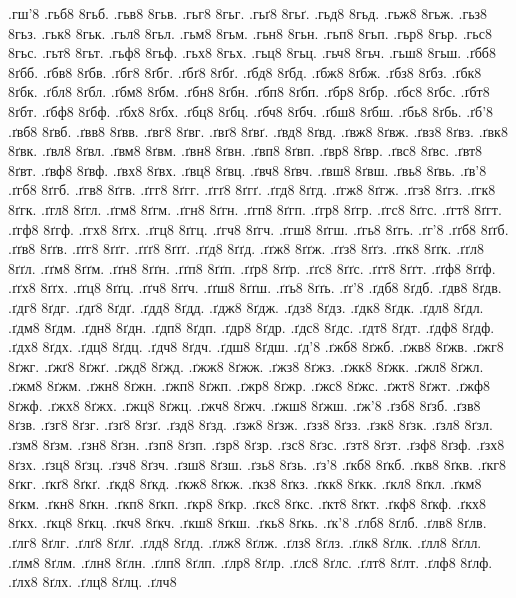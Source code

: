 {%
.гш'8
.гьб8
8гьб.
.гьв8
8гьв.
.гьг8
8гьг.
.гьґ8
8гьґ.
.гьд8
8гьд.
.гьж8
8гьж.
.гьз8
8гьз.
.гьк8
8гьк.
.гьл8
8гьл.
.гьм8
8гьм.
.гьн8
8гьн.
.гьп8
8гьп.
.гьр8
8гьр.
.гьс8
8гьс.
.гьт8
8гьт.
.гьф8
8гьф.
.гьх8
8гьх.
.гьц8
8гьц.
.гьч8
8гьч.
.гьш8
8гьш.
.ґбб8
8ґбб.
.ґбв8
8ґбв.
.ґбг8
8ґбг.
.ґбґ8
8ґбґ.
.ґбд8
8ґбд.
.ґбж8
8ґбж.
.ґбз8
8ґбз.
.ґбк8
8ґбк.
.ґбл8
8ґбл.
.ґбм8
8ґбм.
.ґбн8
8ґбн.
.ґбп8
8ґбп.
.ґбр8
8ґбр.
.ґбс8
8ґбс.
.ґбт8
8ґбт.
.ґбф8
8ґбф.
.ґбх8
8ґбх.
.ґбц8
8ґбц.
.ґбч8
8ґбч.
.ґбш8
8ґбш.
.ґбь8
8ґбь.
.ґб'8
.ґвб8
8ґвб.
.ґвв8
8ґвв.
.ґвг8
8ґвг.
.ґвґ8
8ґвґ.
.ґвд8
8ґвд.
.ґвж8
8ґвж.
.ґвз8
8ґвз.
.ґвк8
8ґвк.
.ґвл8
8ґвл.
.ґвм8
8ґвм.
.ґвн8
8ґвн.
.ґвп8
8ґвп.
.ґвр8
8ґвр.
.ґвс8
8ґвс.
.ґвт8
8ґвт.
.ґвф8
8ґвф.
.ґвх8
8ґвх.
.ґвц8
8ґвц.
.ґвч8
8ґвч.
.ґвш8
8ґвш.
.ґвь8
8ґвь.
.ґв'8
.ґгб8
8ґгб.
.ґгв8
8ґгв.
.ґгг8
8ґгг.
.ґгґ8
8ґгґ.
.ґгд8
8ґгд.
.ґгж8
8ґгж.
.ґгз8
8ґгз.
.ґгк8
8ґгк.
.ґгл8
8ґгл.
.ґгм8
8ґгм.
.ґгн8
8ґгн.
.ґгп8
8ґгп.
.ґгр8
8ґгр.
.ґгс8
8ґгс.
.ґгт8
8ґгт.
.ґгф8
8ґгф.
.ґгх8
8ґгх.
.ґгц8
8ґгц.
.ґгч8
8ґгч.
.ґгш8
8ґгш.
.ґгь8
8ґгь.
.ґг'8
.ґґб8
8ґґб.
.ґґв8
8ґґв.
.ґґг8
8ґґг.
.ґґґ8
8ґґґ.
.ґґд8
8ґґд.
.ґґж8
8ґґж.
.ґґз8
8ґґз.
.ґґк8
8ґґк.
.ґґл8
8ґґл.
.ґґм8
8ґґм.
.ґґн8
8ґґн.
.ґґп8
8ґґп.
.ґґр8
8ґґр.
.ґґс8
8ґґс.
.ґґт8
8ґґт.
.ґґф8
8ґґф.
.ґґх8
8ґґх.
.ґґц8
8ґґц.
.ґґч8
8ґґч.
.ґґш8
8ґґш.
.ґґь8
8ґґь.
.ґґ'8
.ґдб8
8ґдб.
.ґдв8
8ґдв.
.ґдг8
8ґдг.
.ґдґ8
8ґдґ.
.ґдд8
8ґдд.
.ґдж8
8ґдж.
.ґдз8
8ґдз.
.ґдк8
8ґдк.
.ґдл8
8ґдл.
.ґдм8
8ґдм.
.ґдн8
8ґдн.
.ґдп8
8ґдп.
.ґдр8
8ґдр.
.ґдс8
8ґдс.
.ґдт8
8ґдт.
.ґдф8
8ґдф.
.ґдх8
8ґдх.
.ґдц8
8ґдц.
.ґдч8
8ґдч.
.ґдш8
8ґдш.
.ґд'8
.ґжб8
8ґжб.
.ґжв8
8ґжв.
.ґжг8
8ґжг.
.ґжґ8
8ґжґ.
.ґжд8
8ґжд.
.ґжж8
8ґжж.
.ґжз8
8ґжз.
.ґжк8
8ґжк.
.ґжл8
8ґжл.
.ґжм8
8ґжм.
.ґжн8
8ґжн.
.ґжп8
8ґжп.
.ґжр8
8ґжр.
.ґжс8
8ґжс.
.ґжт8
8ґжт.
.ґжф8
8ґжф.
.ґжх8
8ґжх.
.ґжц8
8ґжц.
.ґжч8
8ґжч.
.ґжш8
8ґжш.
.ґж'8
.ґзб8
8ґзб.
.ґзв8
8ґзв.
.ґзг8
8ґзг.
.ґзґ8
8ґзґ.
.ґзд8
8ґзд.
.ґзж8
8ґзж.
.ґзз8
8ґзз.
.ґзк8
8ґзк.
.ґзл8
8ґзл.
.ґзм8
8ґзм.
.ґзн8
8ґзн.
.ґзп8
8ґзп.
.ґзр8
8ґзр.
.ґзс8
8ґзс.
.ґзт8
8ґзт.
.ґзф8
8ґзф.
.ґзх8
8ґзх.
.ґзц8
8ґзц.
.ґзч8
8ґзч.
.ґзш8
8ґзш.
.ґзь8
8ґзь.
.ґз'8
.ґкб8
8ґкб.
.ґкв8
8ґкв.
.ґкг8
8ґкг.
.ґкґ8
8ґкґ.
.ґкд8
8ґкд.
.ґкж8
8ґкж.
.ґкз8
8ґкз.
.ґкк8
8ґкк.
.ґкл8
8ґкл.
.ґкм8
8ґкм.
.ґкн8
8ґкн.
.ґкп8
8ґкп.
.ґкр8
8ґкр.
.ґкс8
8ґкс.
.ґкт8
8ґкт.
.ґкф8
8ґкф.
.ґкх8
8ґкх.
.ґкц8
8ґкц.
.ґкч8
8ґкч.
.ґкш8
8ґкш.
.ґкь8
8ґкь.
.ґк'8
.ґлб8
8ґлб.
.ґлв8
8ґлв.
.ґлг8
8ґлг.
.ґлґ8
8ґлґ.
.ґлд8
8ґлд.
.ґлж8
8ґлж.
.ґлз8
8ґлз.
.ґлк8
8ґлк.
.ґлл8
8ґлл.
.ґлм8
8ґлм.
.ґлн8
8ґлн.
.ґлп8
8ґлп.
.ґлр8
8ґлр.
.ґлс8
8ґлс.
.ґлт8
8ґлт.
.ґлф8
8ґлф.
.ґлх8
8ґлх.
.ґлц8
8ґлц.
.ґлч8
}
